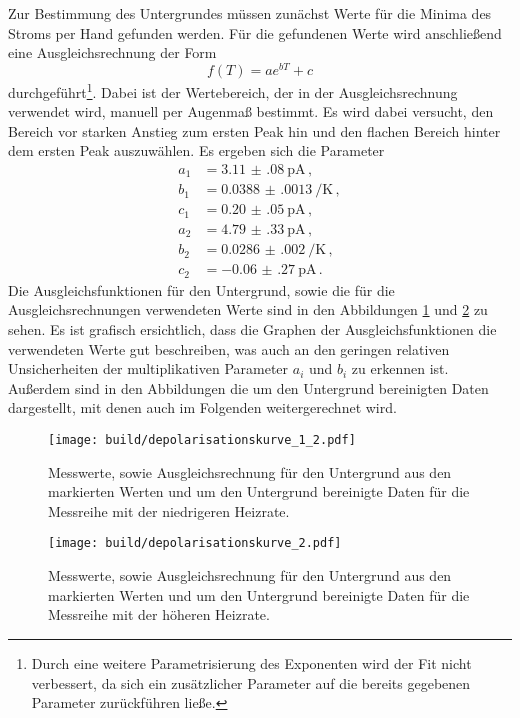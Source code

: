 Zur Bestimmung des Untergrundes müssen zunächst Werte für die Minima des Stroms per Hand gefunden
werden. Für die gefundenen Werte wird anschließend eine Ausgleichsrechnung der
Form
\begin{equation*}
  f(T)=a e^{bT} +c
\end{equation*}
durchgeführt\footnote{Durch eine weitere Parametrisierung des Exponenten wird der Fit nicht verbessert, da sich ein zusätzlicher Parameter auf die bereits gegebenen Parameter zurückführen ließe.}. Dabei ist der Wertebereich, der in der Ausgleichsrechnung verwendet wird,
manuell per Augenmaß bestimmt. Es wird dabei versucht, den Bereich vor starken Anstieg zum ersten Peak hin und den flachen Bereich hinter dem ersten Peak auszuwählen.
Es ergeben sich die Parameter
\begin{align*}
  a_1&=\SI{3.11(08)}{\pico\ampere}  \,,\\
	b_1&=\SI{0.0388(0013)}{\per\kelvin}  \,,\\
  c_1&=\SI{0.20(05)}{\pico\ampere}  \,,\\
  a_2&=\SI{4.79(33)}{\pico\ampere}  \,,\\
	b_2&=\SI{0.0286(0020)}{\per\kelvin}  \,,\\
  c_2&=\SI{-0.06(27)}{\pico\ampere}  \,.
\end{align*}
Die Ausgleichsfunktionen für den Untergrund, sowie die für die Ausgleichsrechnungen
verwendeten Werte sind in den Abbildungen \ref{fig:depol1} und \ref{fig:depol2} zu sehen.
Es ist grafisch ersichtlich, dass die Graphen der Ausgleichsfunktionen die verwendeten Werte gut beschreiben, was auch an den geringen relativen Unsicherheiten der multiplikativen Parameter $a_i$ und $b_i$ zu erkennen ist.
Außerdem sind in den Abbildungen die um den Untergrund bereinigten Daten dargestellt, mit denen auch im Folgenden weitergerechnet wird.

\begin{figure}
  \centering
  \texttt{[image: build/depolarisationskurve\_1\_2.pdf]}
  \caption{Messwerte, sowie Ausgleichsrechnung für den Untergrund aus den markierten Werten
  und um den Untergrund bereinigte Daten für die Messreihe mit der niedrigeren Heizrate.}
  \label{fig:depol1}
\end{figure}
\begin{figure}
  \centering
  \texttt{[image: build/depolarisationskurve\_2.pdf]}
  \caption{Messwerte, sowie Ausgleichsrechnung für den Untergrund aus den markierten Werten
  und um den Untergrund bereinigte Daten für die Messreihe mit der höheren Heizrate.
	\cite{wieso haben wir hier dieses komische Maximum?.}}
  \label{fig:depol2}
\end{figure}

